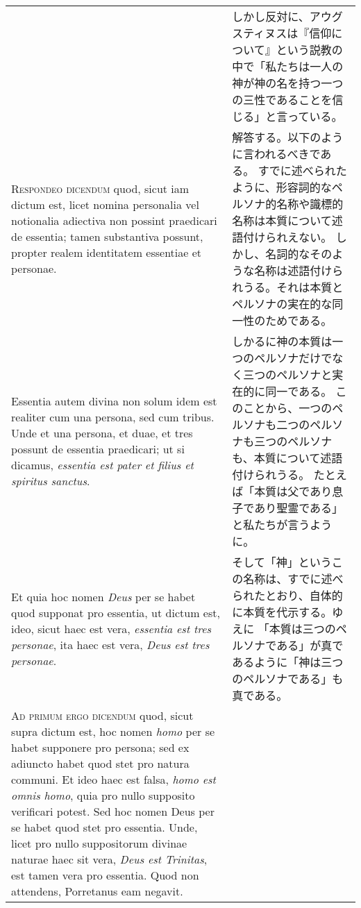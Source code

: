 \documentclass[10pt]{jsarticle} %
\begin{document}
\begin{longtable}{p{21em}p{21em}}
&

しかし反対に、アウグスティヌスは『信仰について』という説教の中で「私たちは一人の神が神の名を持つ一つの三性であることを信じる」と言っている。

\\

\textsc{Respondeo dicendum} quod, sicut iam dictum est, licet nomina personalia vel
notionalia adiectiva non possint praedicari de essentia; tamen substantiva
possunt, propter realem identitatem essentiae et personae. 



&

解答する。以下のように言われるべきである。
すでに述べられたように、形容詞的なペルソナ的名称や識標的名称は本質について述語付けられえない。
しかし、名詞的なそのような名称は述語付けられうる。それは本質とペルソナの実在的な同一性のためである。

\\


Essentia autem
divina non solum idem est realiter cum una persona, sed cum tribus. Unde et una
persona, et duae, et tres possunt de essentia praedicari; ut si dicamus,
\textit{essentia est pater et filius et spiritus sanctus}. 

&

しかるに神の本質は一つのペルソナだけでなく三つのペルソナと実在的に同一である。
このことから、一つのペルソナも二つのペルソナも三つのペルソナも、本質について述語付けられうる。
たとえば「本質は父であり息子であり聖霊である」と私たちが言うように。

\\


Et quia hoc nomen \textit{Deus} per se
habet quod supponat pro essentia, ut dictum est, ideo, sicut haec est vera,
\textit{essentia est tres personae}, ita haec est vera, \textit{Deus est tres personae}.


&

そして「神」というこの名称は、すでに述べられたとおり、自体的に本質を代示する。ゆえに
「本質は三つのペルソナである」が真であるように「神は三つのペルソナである」も真である。

\\

\textsc{Ad primum ergo dicendum} quod, sicut supra dictum est, hoc nomen \textit{homo} per se
habet supponere pro persona; sed ex adiuncto habet quod stet pro natura
communi. Et ideo haec est falsa, \textit{homo est omnis homo}, quia pro nullo supposito
verificari potest. Sed hoc nomen Deus per se habet quod stet pro essentia.
Unde, licet pro nullo suppositorum divinae naturae haec sit vera, \textit{Deus est
Trinitas}, est tamen vera pro essentia. Quod non attendens, Porretanus eam
negavit.



\end{longtable}
\end{document}
